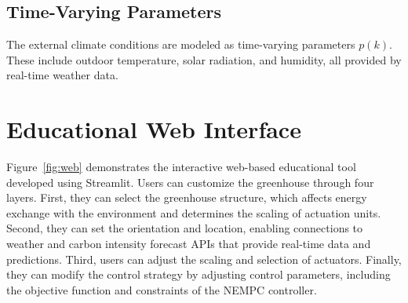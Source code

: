 \documentclass[conference]{IEEEtran}
\begin{document}
\subsection{Time-Varying Parameters}
The external climate conditions are modeled as time-varying parameters \( p(k) \). These include outdoor temperature, solar radiation, and humidity, all provided by real-time weather data.

\section{Educational Web Interface}
Figure~\ref{fig:web} demonstrates the interactive web-based educational tool developed using Streamlit. Users can customize the greenhouse through four layers. First, they can select the greenhouse structure, which affects energy exchange with the environment and determines the scaling of actuation units. Second, they can set the orientation and location, enabling connections to weather and carbon intensity forecast APIs that provide real-time data and predictions. Third, users can adjust the scaling and selection of actuators. Finally, they can modify the control strategy by adjusting control parameters, including the objective function and constraints of the NEMPC controller.
\end{document}

